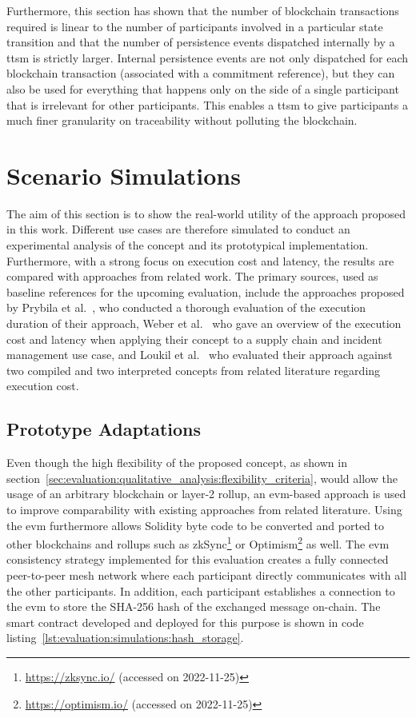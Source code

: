 Furthermore, this section has shown that the number of blockchain transactions required is linear to the number of participants involved in a particular state transition and that the number of persistence events dispatched internally by a \gls{ttsm} is strictly larger. Internal persistence events are not only dispatched for each blockchain transaction (associated with a commitment reference), but they can also be used for everything that happens only on the side of a single participant that is irrelevant for other participants. This enables a \gls{ttsm} to give participants a much finer granularity on traceability without polluting the blockchain.



\section{Scenario Simulations}
\label{sec:evaluation:simulations}
The aim of this section is to show the real-world utility of the approach proposed in this work. Different use cases are therefore simulated to conduct an experimental analysis of the concept and its prototypical implementation. Furthermore, with a strong focus on execution cost and latency, the results are compared with approaches from related work. The primary sources, used as baseline references for the upcoming evaluation, include the approaches proposed by Prybila et al.~\cite{runtime_verification_for_bp_utilizing_bitcoin}, who conducted a thorough evaluation of the execution duration of their approach, Weber et al.~\cite{untrusted_bp_execution_using_blockchain} who gave an overview of the execution cost and latency when applying their concept to a supply chain and incident management use case, and Loukil et al.~\cite{interpreted_bp_on_blockchain_loukil} who evaluated their approach against two compiled and two interpreted concepts from related literature regarding execution cost.


\subsection{Prototype Adaptations}
\label{sec:evaluation:simulations:adaptations}
Even though the high flexibility of the proposed concept, as shown in section~\ref{sec:evaluation:qualitative_analysis:flexibility_criteria}, would allow the usage of an arbitrary blockchain or layer-2 rollup, an \gls{evm}-based approach is used to improve comparability with existing approaches from related literature. Using the \gls{evm} furthermore allows Solidity byte code to be converted and ported to other blockchains and rollups such as zkSync\footnote{\url{https://zksync.io/} (accessed on 2022-11-25)} or Optimism\footnote{\url{https://optimism.io/} (accessed on 2022-11-25)} as well. The \gls{evm} consistency strategy implemented for this evaluation creates a fully connected peer-to-peer mesh network where each participant directly communicates with all the other participants. In addition, each participant establishes a connection to the \gls{evm} to store the SHA-256 hash of the exchanged message on-chain. The smart contract developed and deployed for this purpose is shown in code listing~\ref{lst:evaluation:simulations:hash_storage}.\\

